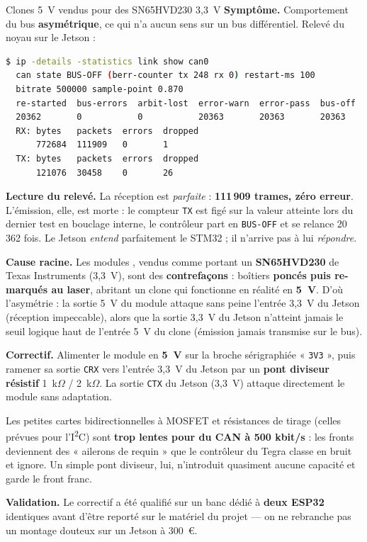 \documentclass[11pt,a4paper]{article}
\begin{document}
\begin{verroulevé}{Clones 5~V vendus pour des SN65HVD230 3,3~V}
\textbf{Symptôme.} Comportement du bus \textbf{asymétrique}, ce qui n'a aucun sens sur un
bus différentiel. Relevé du noyau sur le Jetson :

\begin{lstlisting}[language=bash]
$ ip -details -statistics link show can0
  can state BUS-OFF (berr-counter tx 248 rx 0) restart-ms 100
  bitrate 500000 sample-point 0.870
  re-started  bus-errors  arbit-lost  error-warn  error-pass  bus-off
  20362       0           0           20363       20363       20363
  RX: bytes   packets  errors  dropped
      772684  111909   0       1
  TX: bytes   packets  errors  dropped
      121076  30458    0       26
\end{lstlisting}

\textbf{Lecture du relevé.} La réception est \emph{parfaite} : \textbf{111\,909 trames, zéro
erreur}. L'émission, elle, est morte : le compteur \texttt{TX} est figé sur la valeur
atteinte lors du dernier test en bouclage interne, le contrôleur part en \texttt{BUS-OFF} et
se relance 20\,362 fois. Le Jetson \emph{entend} parfaitement le STM32 ; il n'arrive pas à
lui \emph{répondre}.

\textbf{Cause racine.} Les modules , vendus comme portant un
\textbf{SN65HVD230} de Texas Instruments (3,3~V), sont des \textbf{contrefaçons} : boîtiers
\textbf{poncés puis re-marqués au laser}, abritant un clone qui fonctionne en réalité en
\textbf{5~V}. D'où l'asymétrie : la sortie 5~V du module attaque sans peine l'entrée 3,3~V du
Jetson (réception impeccable), alors que la sortie 3,3~V du Jetson n'atteint jamais le seuil
logique haut de l'entrée 5~V du clone (émission jamais transmise sur le bus).

\textbf{Correctif.} Alimenter le module en \textbf{5~V} sur la broche sérigraphiée
« \texttt{3V3} », puis ramener sa sortie \texttt{CRX} vers l'entrée 3,3~V du Jetson par un
\textbf{pont diviseur résistif} 1~k$\Omega$ / 2~k$\Omega$. La sortie \texttt{CTX} du Jetson
(3,3~V) attaque directement le module sans adaptation.

\begin{avertissement}
Les petites cartes bidirectionnelles à MOSFET et résistances de tirage (celles prévues pour
l'I\textsuperscript{2}C) sont \textbf{trop lentes pour du CAN à 500 kbit/s} : les fronts
deviennent des « ailerons de requin » que le contrôleur du Tegra classe en bruit et ignore.
Un simple pont diviseur, lui, n'introduit quasiment aucune capacité et garde le front franc.
\end{avertissement}

\textbf{Validation.} Le correctif a été qualifié sur un banc dédié à \textbf{deux ESP32}
identiques avant d'être reporté sur le matériel du projet — on ne rebranche pas un montage
douteux sur un Jetson à 300~\euro{}.
\end{verroulevé}
\end{document}
